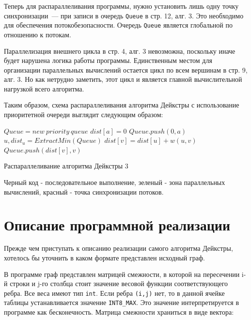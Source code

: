 \documentclass{article}
\newenvironment{myalgorithm}[1][htb]
  {\renewcommand{\algorithmcfname}{Алгоритм}
   \begin{algorithm}[#1]%
  }{\end{algorithm}}
\begin{document}
\par Теперь для распараллеливания программы, нужно установить лишь одну точку синхронизации~--- при записи в очередь \verb|Queue| в стр. 12, алг. 3. Это необходимо для обеспечения потокобезопасности. Очередь \verb|Queue| является глобальной по отношению к потокам.

\par Параллелизация внешнего цикла в стр. 4, алг. 3 невозможна, поскольку иначе будет нарушена логика работы программы. Единственным местом для организации параллельных вычислений остается цикл по всем вершинам в стр. 9, алг. 3. Но как нетрудно заметить, этот цикл и является главной вычислительной нагрузкой всего алгоритма.
 
\par Таким образом, схема распараллеливания алгоритма Дейкстры с использование приоритетной очереди выглядит следующим образом: \\   

\begin{myalgorithm}[H]
\SetAlgoLined
\BlankLine
$Queue = new\ priority\ queue$\;
$dist[a] = 0$\;
$Queue.push(0, a)$\;
 {
$u, dist_u = ExtractMin(Queue)$\;
\textcolor{mygreen}{
\BlankLine
{} {
 {
 $dist[v] = dist[u] + w(u, v)$\;
 \textcolor{myred}{$Queue.push(dist[v], v)$\;} } }
 } 
}
\caption{Распараллеливание алгоритма Дейкстры 3}
\end{myalgorithm}

\par Черный код - последовательное выполнение, зеленый - зона параллельных вычислений, красный - точка синхронизации потоков. 

\newpage

\section{Описание программной реализации}
Прежде чем приступать к описанию реализации самого алгоритма Дейкстры, хотелось бы уточнить в каком формате представлен исходный граф.

\par В программе граф представлен матрицей смежности, в которой на пересечении i-й строки  и j-го столбца стоит значение весовой функции соответствующего ребра. Все веса имеют тип \verb|int|. Если ребра \verb|(i,j)| нет, то в данной ячейке таблицы устанавливается значение \verb|INT8_MAX|. Это значение интерпретируется в программе как бесконечность. Матрица смежности храниться в виде вектора:
\end{document}

